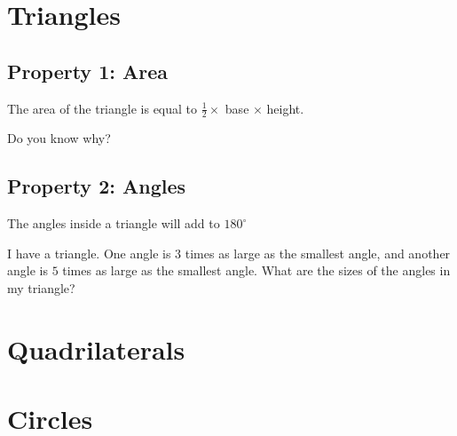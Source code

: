 \documentclass{article}
\theoremstyle{mytheoremstyle}
\theoremstyle{mytheoremstyle}
\theoremstyle{myproblemstyle}
\begin{document}
    \section{Triangles}

    \subsection{Property 1: Area}
    The area of the triangle is equal to $\frac{1}{2} \times$ base $\times$ height.

    \begin{problem}
        Do you know why?
    \end{problem}

    \subsection{Property 2: Angles}
    The angles inside a triangle will add to $180^{\circ}$

    \begin{problem}
        I have a triangle. One angle is $3$ times as large as the smallest angle, and another angle is $5$ times as large as the smallest angle. What are the sizes of the angles in my triangle?
    \end{problem}

    \section{Quadrilaterals}

    \section{Circles}
    
\end{document}
